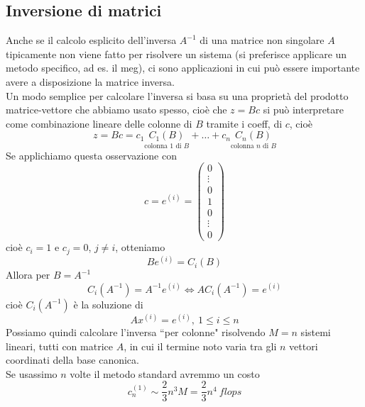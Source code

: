 \subsection{Inversione di matrici}
Anche se il calcolo esplicito dell'inversa $A^{-1}$ di una matrice non singolare $A$ tipicamente non viene fatto per risolvere un sistema (si preferisce applicare un metodo specifico, ad es. il meg), ci sono applicazioni in cui può essere importante avere a disposizione la matrice inversa. \\
Un modo semplice per calcolare l'inversa si basa su una proprietà del prodotto matrice-vettore che abbiamo usato spesso, cioè che $z=Bc$ si può interpretare come combinazione lineare delle colonne di $B$ tramite i coeff, di $c$, cioè
\begin{equation*}
    z=Bc=c_1\underset{\text{colonna 1 di $B$}}{C_1(B)}+\dots+c_n\underset{\text{colonna $n$ di $B$}}{C_n(B)}
\end{equation*}
Se applichiamo questa osservazione con
\begin{equation*}
    c=e^{(i)}=\begin{pmatrix}
    0 \\
    \vdots \\
    0 \\
    1 \\
    0 \\
    \vdots \\
    0
    \end{pmatrix}
\end{equation*}
cioè $c_i = 1$ e $c_j = 0$, $j \neq i$, otteniamo
\begin{equation*}
    Be^{(i)} = C_i(B)
\end{equation*}
Allora per $B=A^{-1}$
\begin{equation*}
    C_i(A^{-1})=A^{-1}e^{(i)} \Leftrightarrow AC_i(A^{-1})=e^{(i)}
\end{equation*}
cioè $C_i(A^{-1})$ è la soluzione di
\begin{equation*}
    Ax^{(i)} = e^{(i)}, \ 1\leq i \leq n
\end{equation*}
Possiamo quindi calcolare l'inversa ``per colonne" risolvendo $M=n$ sistemi lineari, tutti con matrice $A$, in cui il termine noto varia tra gli $n$ vettori coordinati della base canonica. \\
Se usassimo $n$ volte il metodo standard avremmo un costo
\begin{equation*}
    c_n^{(1)} \sim \frac{2}{3}n^3M = \frac{2}{3}n^4 \ flops
\end{equation*}
